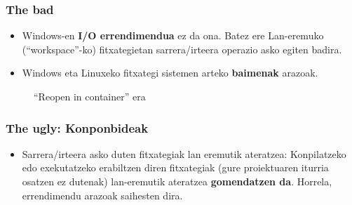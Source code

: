 \documentclass[lang=eu,biz=foe,aspectratio=169,handout]{mupresentation}
\begin{document}
\begin{frame}
  \frametitle{The bad}
  \begin{itemize}
    \item Windows-en \textbf{I/O errendimendua} ez da ona. Batez ere Lan-eremuko\\(``workspace''-ko) fitxategietan sarrera/irteera operazio asko egiten badira.
    \item Windows eta Linuxeko fitxategi sistemen arteko \textbf{baimenak} arazoak.
  \end{itemize}
  \begin{figure}
    \centering
    \caption{``Reopen in container'' era}
  \end{figure}
\end{frame}

\begin{frame}
  \frametitle{The ugly: Konponbideak}
  \begin{itemize}
    \item Sarrera/irteera asko duten fitxategiak lan eremutik ateratzea: Konpilatzeko edo exekutatzeko erabiltzen diren fitxategiak (gure proiektuaren iturria osatzen ez dutenak) lan-eremutik ateratzea \textbf{gomendatzen da}. Horrela, errendimendu arazoak saihesten dira.
  \end{itemize}
\end{frame}
\end{document}
